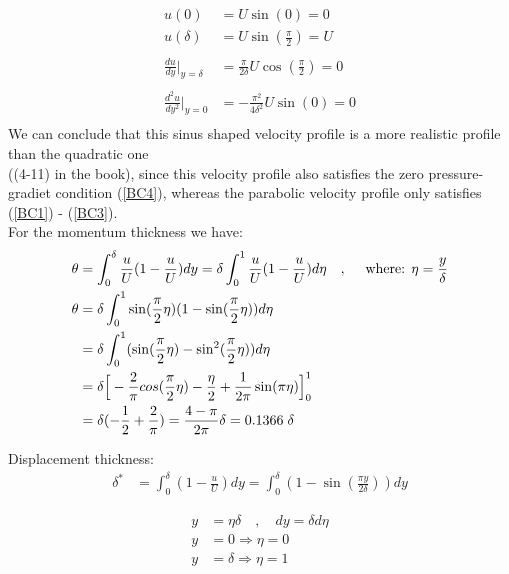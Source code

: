 \documentclass[a4paper,10pt]{book}
\begin{document}
\begin{align}
u(0) &= U \sin(0) = 0 \label{BC1}\\
u(\delta) &= U \sin (\frac{\pi}{2}) = U \label{BC2}\\ \nonumber \\
\frac{d u}{d y} \bigg\rvert_{y=\delta} &= \frac{\pi}{2 \delta} U \cos(\frac{\pi}{2}) = 0 \label{BC3}\\ \nonumber \\
\frac{d^2 u}{d y^2} \bigg\rvert_{y=0} &= -\frac{\pi^2}{4 \delta^2} U \sin(0) = 0 \label{BC4}\\ \nonumber
\end{align}
We can conclude that this sinus shaped velocity profile is a more realistic profile than the quadratic one\\ 
((4-11) in the book), since this velocity profile also satisfies the zero pressure-gradiet condition (\ref{BC4}), 
whereas the parabolic velocity profile only satisfies (\ref{BC1}) - (\ref{BC3}).\\
\vspace{4mm}
For the momentum thickness we have:
\begin{align}
\begin{split}
\theta &= \int_0^\delta \frac{u}{U}(1- \frac{u}{U}) dy 
= \delta \int_0^1 \frac{u}{U}(1- \frac{u}{U}) d\eta \quad,\quad 
\text{ where: } \eta = \frac{y}{\delta}\\
\theta &= \delta \int_0^1 \sin (\frac{\pi}{2} \eta) (1- \sin(\frac{\pi}{2} \eta)) d \eta\\
&= \delta \int_0^1 (\sin (\frac{\pi}{2} \eta) - \sin^2(\frac{\pi}{2} \eta)) d \eta\\
&= \delta \Big[ -\frac{2}{\pi} cos(\frac{\pi}{2} \eta) - 
\frac{\eta}{2} + \frac{1}{2 \pi} \sin(\pi \eta) \Big]_0^1\\
&= \delta (-\frac{1}{2} + \frac{2}{\pi}) = \frac{4 - \pi}{2 \pi} \delta = 0.1366 \hspace{1mm} \delta \label{theta}
\end{split}
\end{align}

Displacement thickness:
\begin{align}
\delta^* &= \int_0^\delta (1- \frac{u}{U}) dy = \int_0^\delta (1-\sin(\frac{\pi y}{2 \delta})) dy \label{deltastar1}
\end{align}

\begin{align*}
y &= \eta \delta \quad,\quad dy = \delta d \eta\\
y &= 0 \Rightarrow \eta = 0\\
y &= \delta \Rightarrow \eta = 1
\end{align*}
\end{document}
